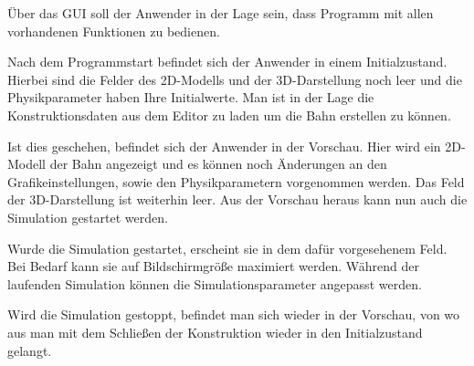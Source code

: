 Über das GUI soll der Anwender in der Lage sein, dass Programm mit allen vorhandenen Funktionen zu bedienen.

Nach dem Programmstart befindet sich der Anwender in einem Initialzustand. Hierbei sind die Felder des 2D-Modells und der 3D-Darstellung noch leer und die Physikparameter haben Ihre Initialwerte. Man ist in der Lage die Konstruktionsdaten aus dem Editor zu laden um die Bahn erstellen zu können.

Ist dies geschehen, befindet sich der Anwender in der Vorschau. Hier wird ein 2D-Modell der Bahn angezeigt und es können noch Änderungen an den Grafikeinstellungen, sowie den Physikparametern vorgenommen werden. Das Feld der 3D-Darstellung ist weiterhin leer. Aus der Vorschau heraus kann nun auch die Simulation gestartet werden.

Wurde die Simulation gestartet, erscheint sie in dem dafür vorgesehenem Feld. Bei Bedarf kann sie auf Bildschirmgröße maximiert werden. Während der laufenden Simulation können die Simulationsparameter angepasst werden.

Wird die Simulation gestoppt, befindet man sich wieder in der Vorschau, von wo aus man mit dem Schließen der Konstruktion wieder in den Initialzustand gelangt.